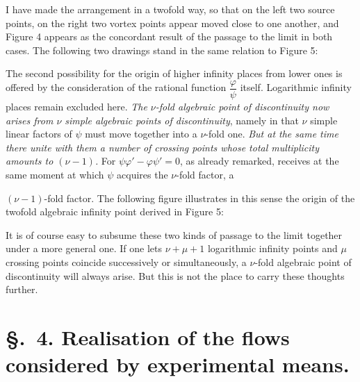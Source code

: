 \documentclass{article}
\begin{document}
I have made the arrangement in a twofold way, so that on the left two source points, on the right two vortex points appear moved close to one another, and Figure 4 appears as the concordant result of the passage to the limit in both cases. The following two drawings stand in the same relation to Figure 5:


The second possibility for the origin of higher infinity places from lower ones is offered by the consideration of the rational function $\dfrac{\varphi}{\psi}$ itself. Logarithmic infinity places remain excluded here. \emph{The $\nu$-fold algebraic point of discontinuity now arises from $\nu$ simple algebraic points of discontinuity}, namely in that $\nu$ simple linear factors of $\psi$ must move together into a $\nu$-fold one. \emph{But at the same time there unite with them a number of crossing points whose total multiplicity amounts to $(\nu - 1)$.} For $\psi\varphi' - \varphi\psi' = 0$, as already remarked, receives at the same moment at which $\psi$ acquires the $\nu$-fold factor, a

$(\nu - 1)$-fold factor. The following figure illustrates in this sense the origin of the twofold algebraic infinity point derived in Figure 5:


It is of course easy to subsume these two kinds of passage to the limit together under a more general one. If one lets $\nu + \mu + 1$ logarithmic infinity points and $\mu$ crossing points coincide successively or simultaneously, a $\nu$-fold algebraic point of discontinuity will always arise. But this is not the place to carry these thoughts further.

\section*{§.~4. Realisation of the flows considered by experimental means.}
\end{document}
